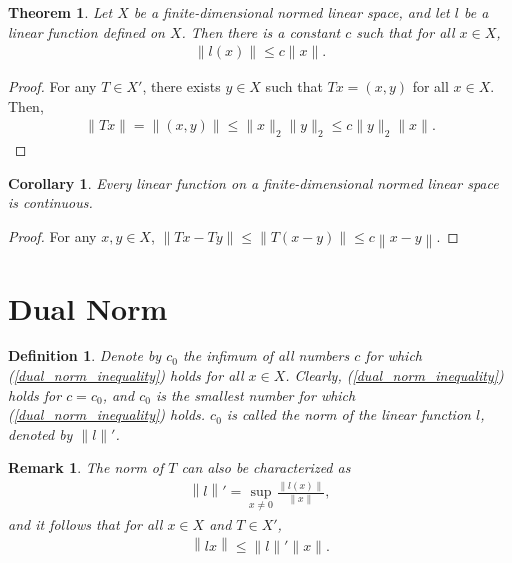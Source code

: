 \documentclass[11pt]{book}
\newtheorem{definition}{Definition}[chapter]
\newtheorem{theorem}{Theorem}[chapter]
\newtheorem{corollary}{Corollary}[theorem]
\newtheorem{remark}{Remark}[chapter]
\theoremstyle{definition}
\numberwithin{equation}{chapter}
\begin{document}
\medskip

\begin{theorem}
Let $X$ be a finite-dimensional normed linear space, and let $l$ be a linear function defined on $X$. Then there is a constant $c$ such that for all $x \in X$,
\begin{align}\label{dual_norm_inequality}
    \|l(x)\| \leq c \|x\|.
\end{align}
\end{theorem}
\begin{proof}
For any $T \in X'$, there exists $y \in X$ such that $Tx = (x, y)$ for all $x \in X$. Then,
\begin{align*}
    \|Tx\| = \|(x,y)\| \leq \|x\|_2 \|y\|_2 \leq c \|y\|_2 \|x\|.
\end{align*}
\end{proof}

\medskip

\begin{corollary}\label{linear_function_continuous}
Every linear function on a finite-dimensional normed linear space is continuous.
\end{corollary}
\begin{proof}
For any $x, y \in X$, $\left\|Tx - Ty\right\| \leq \left\|T(x - y)\right\| \leq c \left\|x - y\right\|$.
\end{proof}

\medskip

\section{Dual Norm}

\begin{definition}
Denote by $c_0$ the infimum of all numbers $c$ for which (\ref{dual_norm_inequality}) holds for all $x \in X$. Clearly, (\ref{dual_norm_inequality}) holds for $c = c_0$, and $c_0$ is the smallest number for which (\ref{dual_norm_inequality}) holds. $c_0$ is called the norm of the linear function $l$, denoted by $\|l\|'$.
\end{definition}

\begin{remark}
The norm of $T$ can also be characterized as
\begin{align}\label{linear_function_norm}
    \left\|l\right\|' = \sup_{x \neq 0} \frac{\|l(x)\|}{\|x\|},
\end{align}
and it follows that for all $x \in X$ and $T \in X'$,
\begin{align}\label{equ_14_5}
    \left\|lx\right\| \leq \|l\|' \|x\|.
\end{align}
\end{remark}
\end{document}
